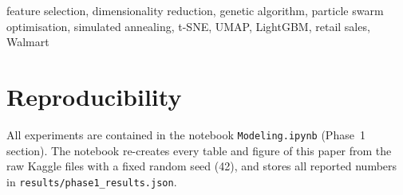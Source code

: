 \documentclass[conference]{IEEEtran}
\begin{document}
\begin{IEEEkeywords}
feature selection, dimensionality reduction, genetic algorithm, particle swarm optimisation, simulated annealing, t-SNE, UMAP, LightGBM, retail sales, Walmart
\end{IEEEkeywords}





\section*{Reproducibility}
All experiments are contained in the notebook \texttt{Modeling.ipynb} (Phase~1 section). The notebook re-creates every table and figure of this paper from the raw Kaggle files with a fixed random seed (42), and stores all reported numbers in \texttt{results/phase1\_results.json}.



\end{document}
